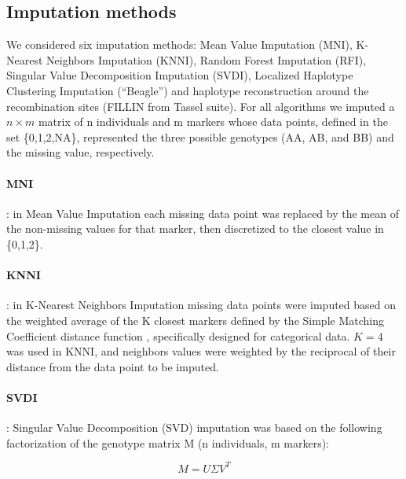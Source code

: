 \subsection{Imputation methods}
\label{sec:imputation_methods}
We considered six imputation methods: Mean Value Imputation (MNI), K-Nearest Neighbors Imputation (KNNI), Random Forest Imputation (RFI), Singular Value Decomposition Imputation (SVDI), Localized Haplotype Clustering Imputation (``Beagle'') and haplotype reconstruction around the recombination sites (FILLIN from Tassel suite). For all algorithms we imputed a $n\times m$ matrix of n individuals and m markers whose data points, defined in the set \{0,1,2,NA\}, represented the three possible genotypes (AA, AB, and BB) and the missing value, respectively. 
\paragraph{MNI}
\label{par:MNI}
: in Mean Value Imputation each missing data point was replaced by the mean of the non-missing values for that marker, then discretized to the closest value in \{0,1,2\}.
\paragraph{KNNI}
\label{par:KNNI}
: in K-Nearest Neighbors Imputation missing data points were imputed based on the weighted average of the K closest markers \cite{troyanskaya_missing_2001} defined by the Simple Matching Coefficient distance function \cite{schwender_statistical_2007}, specifically designed for categorical data. $K=4$ was used in KNNI, and neighbors values were weighted by the reciprocal of their distance from the data point to be imputed.
\paragraph{SVDI}
\label{par:SVDI}
: Singular Value Decomposition (SVD) imputation was based on the following factorization of the genotype matrix M (n individuals, m markers):

\begin{equation}
\label{eq:SVDI_general}
M = U\Sigma V^{T}
\end{equation}

